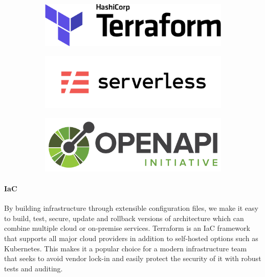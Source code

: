 \documentclass[10pt]{article}
\begin{document}
\begin{figure}[h!]
	\centering
	\begin{subfigure}{0.25\linewidth}
		\includegraphics[width=\linewidth]{images/Terraform.png}
	\end{subfigure}
	\begin{subfigure}{0.25\linewidth}
		\includegraphics[width=\linewidth]{images/Serverless.png}
	\end{subfigure}
	\begin{subfigure}{0.25\linewidth}
		\includegraphics[width=\linewidth]{images/OpenAPI.png}
	\end{subfigure}
\end{figure}

\paragraph{IaC}
By building infrastructure through extensible configuration files, we make it easy to build, test, secure, update and rollback versions of architecture which can combine multiple cloud or on-premise services. Terraform is an IaC framework that supports all major cloud providers in addition to self-hosted options such as Kubernetes. This makes it a popular choice for a modern infrastructure team that seeks to avoid vendor lock-in and easily protect the security of it with robust tests and auditing.
\end{document}
